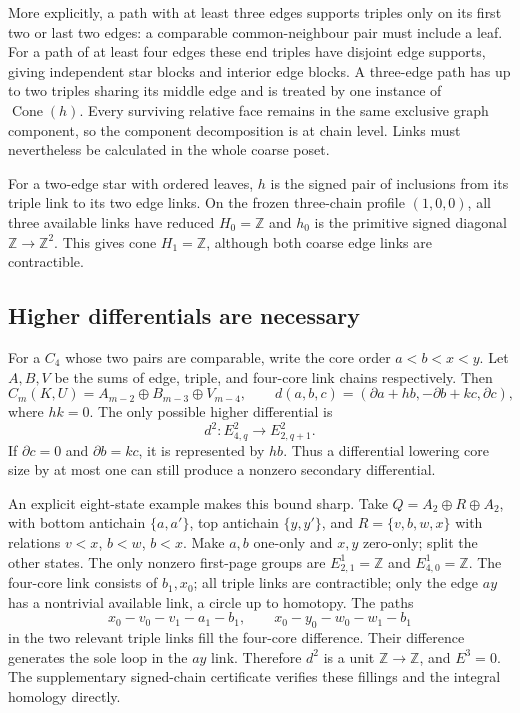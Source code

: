 More explicitly, a path with at least three edges supports triples only
on its first two or last two edges: a comparable common-neighbour pair
must include a leaf.  For a path of at least four edges these end triples
have disjoint edge supports, giving independent star blocks and interior
edge blocks.  A three-edge path has up to two triples sharing its middle
edge and is treated by one instance of $\operatorname{Cone}(h)$.
Every surviving relative face remains in the same exclusive graph
component, so the component decomposition is at chain level.  Links
must nevertheless be calculated in the whole coarse poset.

For a two-edge star with ordered leaves, $h$ is the signed pair of
inclusions from its triple link to its two edge links.  On the frozen
three-chain profile $(1,0,0)$, all three available links have reduced
$H_0=\mathbb Z$ and $h_0$ is the primitive signed diagonal
$\mathbb Z\to\mathbb Z^2$.  This gives cone $H_1=\mathbb Z$,
although both coarse edge links are contractible.

\subsection{Higher differentials are necessary}
For a $C_4$ whose two pairs are comparable, write the core order
$a<b<x<y$.  Let $A,B,V$ be the sums of edge, triple, and four-core link
chains respectively.  Then
\[
 C_m(K,U)=A_{m-2}\oplus B_{m-3}\oplus V_{m-4},\qquad
 d(a,b,c)=(\partial a+hb,-\partial b+kc,\partial c),
\]
where $hk=0$.  The only possible higher differential is
\[
 d^2:E^2_{4,q}\longrightarrow E^2_{2,q+1}.
\]
If $\partial c=0$ and $\partial b=kc$, it is represented by $hb$.
Thus a differential lowering core size by at most one can still produce
a nonzero secondary differential.

An explicit eight-state example makes this bound sharp.  Take
$Q=A_2\oplus R\oplus A_2$, with bottom antichain $\{a,a'\}$,
top antichain $\{y,y'\}$, and
$R=\{v,b,w,x\}$ with relations $v<x$, $b<w$, $b<x$.
Make $a,b$ one-only and $x,y$ zero-only; split the other states.
The only nonzero first-page groups are
$E^1_{2,1}=\mathbb Z$ and $E^1_{4,0}=\mathbb Z$.
The four-core link consists of $b_1,x_0$; all triple links are
contractible; only the edge $ay$ has a nontrivial available link, a circle
up to homotopy.  The paths
\[
 x_0-v_0-v_1-a_1-b_1,\qquad
 x_0-y_0-w_0-w_1-b_1
\]
in the two relevant triple links fill the four-core difference.
Their difference generates the sole loop in the $ay$ link.  Therefore
$d^2$ is a unit $\mathbb Z\to\mathbb Z$, and $E^3=0$.
The supplementary signed-chain certificate verifies these fillings and
the integral homology directly.

